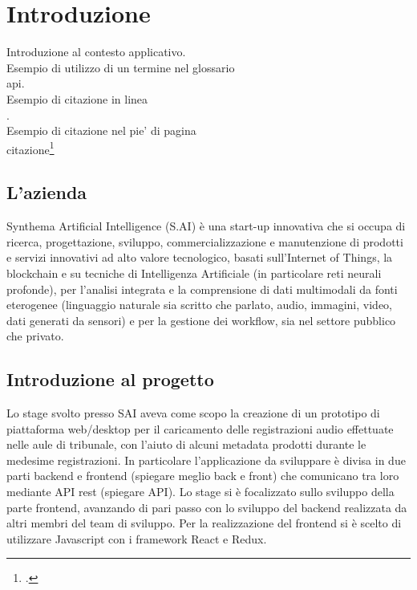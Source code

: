 

\chapter{Introduzione}
\label{cap:introduzione}

Introduzione al contesto applicativo.\\

\noindent Esempio di utilizzo di un termine nel glossario \\
\gls{api}. \\

\noindent Esempio di citazione in linea \\
\cite{site:agile-manifesto}. \\

\noindent Esempio di citazione nel pie' di pagina \\
citazione\footcite{womak:lean-thinking} \\

\section{L'azienda}

Synthema Artificial Intelligence (S.AI) è una start-up innovativa che si occupa di ricerca, progettazione, sviluppo, commercializzazione e manutenzione di
prodotti e servizi innovativi ad alto valore tecnologico, basati sull'Internet of Things, la blockchain e su tecniche di Intelligenza Artificiale
(in particolare reti neurali profonde), per l'analisi integrata e la comprensione di dati multimodali da fonti eterogenee (linguaggio naturale sia scritto che
parlato, audio, immagini, video, dati generati da sensori) e per la gestione dei workflow, sia nel settore pubblico che privato.

\section{Introduzione al progetto}

Lo stage svolto presso SAI aveva come scopo la creazione di un prototipo di piattaforma web/desktop per il caricamento delle registrazioni audio effettuate nelle aule di
tribunale, con l'aiuto di alcuni metadata prodotti durante le medesime registrazioni. In particolare l'applicazione da sviluppare è divisa in due parti backend e frontend
(spiegare meglio back e front) che comunicano tra loro mediante API rest (spiegare API). Lo stage si è focalizzato sullo sviluppo della parte frontend, avanzando di pari passo
con lo sviluppo del  backend realizzata da altri membri del team di sviluppo. Per la realizzazione del frontend si è scelto di utilizzare Javascript con i framework React e Redux.

